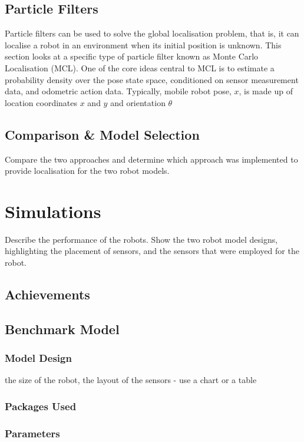 \documentclass[a4paper]{article}
\begin{document}
\subsection{Particle Filters}
Particle filters can be used to solve the global localisation problem, that is, it can localise a robot in an environment when its initial position is unknown. This section looks at a specific type of particle filter known as Monte Carlo Localisation (MCL). One of the core ideas central to MCL is to estimate a probability density over the pose state space, conditioned on sensor measurement data, and odometric action data. Typically, mobile robot pose, $x$, is made up of location coordinates $x$ and $y$ and orientation $\theta$

\subsection{Comparison \& Model Selection}
Compare the two approaches and determine which approach was implemented to provide localisation for the two robot models.

\section{Simulations}
Describe the performance of the robots. Show the two robot model designs, highlighting the placement of sensors, and the sensors that were employed for the robot.

\subsection{Achievements}

\subsection{Benchmark Model}
\subsubsection{Model Design}
the size of the robot, the layout of the sensors - use a chart or a table

\subsubsection{Packages Used}


\subsubsection{Parameters}
\end{document}
